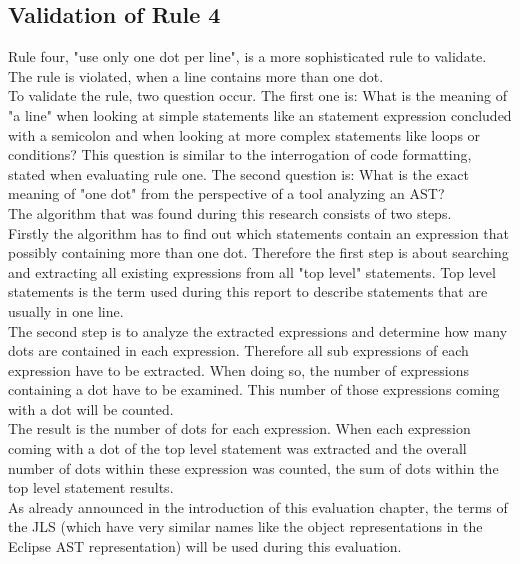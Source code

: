 \subsection*{Validation of Rule 4}
Rule four, "use only one dot per line", is a more sophisticated rule to validate. The rule is violated, when a line contains more than one dot. 
\\

To validate the rule, two question occur. The first one is: What is the meaning of "a line" when looking at simple statements like an statement expression concluded with a semicolon and when looking at more complex statements like loops or conditions? This question is similar to the interrogation of code formatting, stated when evaluating rule one. The second question is: What is the exact meaning of "one dot" from the perspective of a tool analyzing an \acf{AST}?
\\

The algorithm that was found during this research consists of two steps. 
\\

Firstly the algorithm has to find out which statements contain an expression that possibly containing more than one dot. Therefore the first step is about searching and extracting all existing expressions from all "top level" statements. Top level statements is the term used during this report to describe statements that are usually in one line. 
\\

The second step is to analyze the extracted expressions and determine how many dots are contained in each expression. Therefore all sub expressions of each expression have to be extracted. When doing so, the number of expressions containing a dot have to be examined. This number of those expressions coming with a dot will be counted. 
\\

The result is the number of dots for each expression. When each expression coming with a dot of the top level statement was extracted and the overall number of dots within these expression was counted, the sum of dots within the top level statement results. 
\\

As already announced in the introduction of this evaluation chapter, the terms of the \acf{JLS} (which have very similar names like the object representations in the Eclipse \acf{AST} representation) will be used during this evaluation. 
\\

